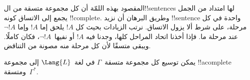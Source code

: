 \documentclass[../../../include/open-logic-section]{subfiles}
\begin{document}
      {}
      {}


\begin{explain}
المقصود بهذه اللمّة أن كل مجموعة متسقة من ال!!{sentence}s لها امتداد
من الجمل يجمع إلى الاتساق كونه !!{complete}. وطريق البرهان أن نزيد
!!{sentence} واحدة في كل مرحلة، على شرط ألا يزول الاتساق. نرتب
الزيادات بحيث كل $!A$ يلحق إما $!A$ وإما $\lnot !A$ عند مرحلة ما.
فإذا أخذنا اتحاد المراحل كلها، وجدنا فيه $!A$ أو نفيها~$\lnot !A$،
فكان كاملًا. ويبقى متسقًا لأن كل مرحلة منه مصونة من التناقض.
\end{explain}

\begin{lem}[لمّة ليندنبوم]
 يمكن توسيع كل مجموعة متسقة~$\Gamma$ في
لغة~$\Lang{L}$ إلى مجموعة !!a{complete} ومتسقة~$\Gamma^*$.
\end{lem}
\end{document}
